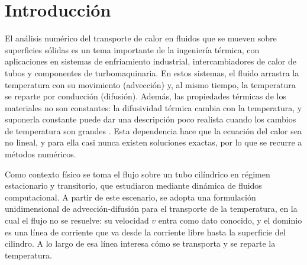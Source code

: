 \documentclass[final,5p,times,twocolumn,authoryear,11pt]{elsarticle}
\begin{document}

\section{Introducción}
\label{sec:introduccion}

El análisis numérico del transporte de calor en fluidos que se mueven sobre superficies sólidas es un tema importante de la ingeniería térmica, con aplicaciones en sistemas de enfriamiento industrial, intercambiadores de calor de tubos y componentes de turbomaquinaria. En estos sistemas, el fluido arrastra la temperatura con su movimiento (advección) y, al mismo tiempo, la temperatura se reparte por conducción (difusión). Además, las propiedades térmicas de los materiales no son constantes: la difusividad térmica cambia con la temperatura, y suponerla constante puede dar una descripción poco realista cuando los cambios de temperatura son grandes \citep{Wang2022, Filipov2023}. Esta dependencia hace que la ecuación del calor sea no lineal, y para ella casi nunca existen soluciones exactas, por lo que se recurre a métodos numéricos.

Como contexto físico se toma el flujo sobre un tubo cilíndrico en régimen estacionario y transitorio, que \citet{Singh2025} estudiaron mediante dinámica de fluidos computacional. A partir de este escenario, se adopta una formulación unidimensional de advección-difusión para el transporte de la temperatura, en la cual el flujo no se resuelve: su velocidad $v$ entra como dato conocido, y el dominio es una línea de corriente que va desde la corriente libre hasta la superficie del cilindro. A lo largo de esa línea interesa cómo se transporta y se reparte la temperatura. 
\end{document}
